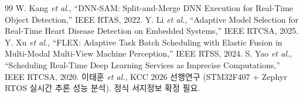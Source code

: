 \documentclass[10pt]{article}
\begin{document}
\begin{thebibliography}{99}
 W. Kang \emph{et al.}, ``DNN-SAM: Split-and-Merge DNN Execution for Real-Time Object Detection,'' IEEE RTAS, 2022.
 Y. Li \emph{et al.}, ``Adaptive Model Selection for Real-Time Heart Disease Detection on Embedded Systems,'' IEEE RTCSA, 2025.
 Y. Xu \emph{et al.}, ``FLEX: Adaptive Task Batch Scheduling with Elastic Fusion in Multi-Modal Multi-View Machine Perception,'' IEEE RTSS, 2024.
 S. Yao \emph{et al.}, ``Scheduling Real-Time Deep Learning Services as Imprecise Computations,'' IEEE RTCSA, 2020.
 이태훈 \emph{et al.}, KCC 2026 선행연구 (STM32F407 + Zephyr RTOS 실시간 추론 성능 분석). 정식 서지정보 확정 필요.
\end{thebibliography}
\end{document}
